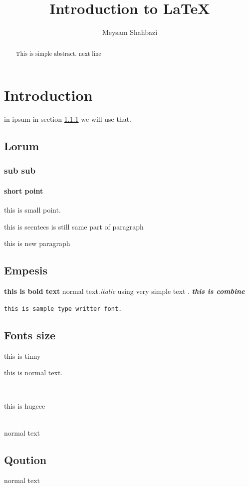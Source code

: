 \documentclass[a4paper,twocolumn]{article}
\title{Introduction to \LaTeX}
\author{Meysam Shahbazi}
\begin{document}
\tableofcontents

\maketitle



\begin{abstract}
	
This is simple abstract.
next line 
	\lipsum[1]
	
\end{abstract}
\section{Introduction}
in ipsum in section \ref{sec:sub sub} we will use that.
\subsection{Lorum}
\lipsum[1]
\subsubsection{sub sub}\label{sec:sub sub}
\lipsum[1]
\paragraph{short point}
this is small point. 
\EUR


this is secntecs is still same part of paragraph

this is new paragraph
\subsection{Empesis}
\textbf{this is bold text} normal text.\textit{italic}
using very simple text .
\textbf{\textit{this is combine}}

{\tt this is sample type writter font.}
\subsection{Fonts size }
{\tiny this is tinny}  \\
\begin{normalsize}
this is normal text.
\end{normalsize} \\
\begin{huge}
	this is hugeee
\end{huge} \\
normal text
\subsection{Qoution}
normal text 
\end{document}
